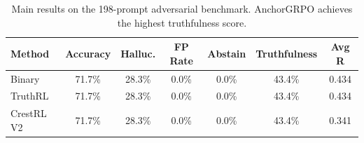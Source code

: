 \begin{table}[t]
\centering
\caption{Main results on the 198-prompt adversarial benchmark. AnchorGRPO achieves the highest truthfulness score.}
\label{tab:main_results}
\begin{tabular}{lcccccc}
\toprule
\textbf{Method} & \textbf{Accuracy} & \textbf{Halluc.} & \textbf{FP Rate} & \textbf{Abstain} & \textbf{Truthfulness} & \textbf{Avg R} \\
\midrule
    Binary & 71.7\% & 28.3\% & 0.0\% & 0.0\% & 43.4\% & 0.434 \\
    TruthRL & 71.7\% & 28.3\% & 0.0\% & 0.0\% & 43.4\% & 0.434 \\
    CrestRL V2 & 71.7\% & 28.3\% & 0.0\% & 0.0\% & 43.4\% & 0.341 \\
\bottomrule
\end{tabular}
\end{table}
